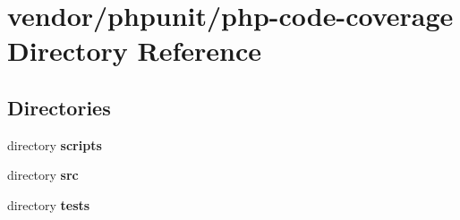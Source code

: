 \section{vendor/phpunit/php-\/code-\/coverage Directory Reference}
\label{dir_42d198bb20d38c18aaf618bed309b43c}
\subsection*{Directories}
\begin{DoxyCompactItemize}
\item 
directory {\bf scripts}
\item 
directory {\bf src}
\item 
directory {\bf tests}
\end{DoxyCompactItemize}
